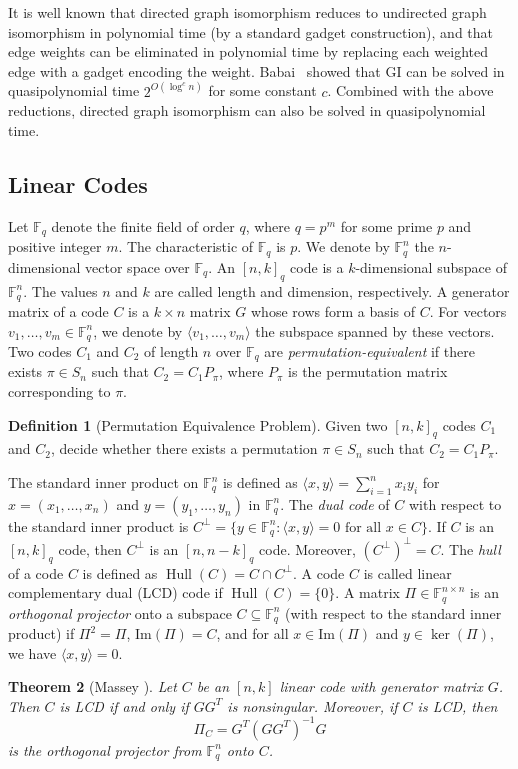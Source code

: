\documentclass[11pt]{article}
\newcommand{\FF}{\mathbb{F}}
\newcommand{\0}{\mathbf{0}}
\newcommand{\1}{\mathbf{1}}
\DeclareMathOperator{\Hull}{Hull}
\theoremstyle{plain}
\newtheorem{theorem}{Theorem}[section]
\theoremstyle{definition}
\newtheorem{definition}[theorem]{Definition}
\theoremstyle{remark}
\begin{document}
It is well known that directed graph isomorphism reduces to undirected graph isomorphism in polynomial time (by a standard gadget construction), and that edge weights can be eliminated in polynomial time by replacing each weighted edge with a gadget encoding the weight. Babai~\cite{babai2016} showed that GI can be solved in quasipolynomial time $2^{O(\log^c n)}$ for some constant $c$. Combined with the above reductions, directed graph isomorphism can also be solved in quasipolynomial time.

\subsection{Linear Codes}
Let $\FF_q$ denote the finite field of order $q$, where $q = p^m$ for some prime $p$ and positive integer $m$. The characteristic of $\FF_q$ is $p$. We denote by $\FF_q^n$ the $n$-dimensional vector space over $\FF_q$.
An $[n,k]_q$ code is a $k$-dimensional subspace of $\FF_q^n$.
The values $n$ and $k$ are called length and dimension, respectively.
A generator matrix of a code $C$ is a $k \times n$ matrix $G$ whose rows form a basis of $C$.
For vectors $v_1, \ldots, v_m \in \FF_q^n$, we denote by $\langle v_1, \ldots, v_m \rangle$ the subspace spanned by these vectors.
Two codes $C_1$ and $C_2$ of length $n$ over $\FF_q$ are \emph{permutation-equivalent} if there exists $\pi \in S_n$ such that $C_2 = C_1 P_\pi$, where $P_\pi$ is the permutation matrix corresponding to $\pi$.

\begin{definition}[Permutation Equivalence Problem]
Given two $[n,k]_q$ codes $C_1$ and $C_2$, decide whether there exists a permutation $\pi \in S_n$ such that $C_2 = C_1 P_\pi$.
\end{definition}

The standard inner product on $\FF_q^n$ is defined as $\langle x, y \rangle = \sum_{i=1}^n x_i y_i$ for $x = (x_1, \ldots, x_n)$ and $y = (y_1, \ldots, y_n)$ in $\FF_q^n$.
The \emph{dual code} of $C$ with respect to the standard inner product is $C^\perp = \{y \in \FF_q^n : \langle x, y \rangle = 0 \text{ for all } x \in C\}$.
If $C$ is an $[n,k]_q$ code, then $C^\perp$ is an $[n,n-k]_q$ code. Moreover, $(C^\perp)^\perp = C$.
The \emph{hull} of a code $C$ is defined as $\Hull(C) = C \cap C^\perp$.
A code $C$ is called linear complementary dual (LCD) code if $\Hull(C) = \{0\}$.
A matrix $\Pi \in \FF_q^{n \times n}$ is an \emph{orthogonal projector} onto a subspace $C \subseteq \FF_q^n$ (with respect to the standard inner product) if $\Pi^2 = \Pi$, $\text{Im}(\Pi) = C$, and for all $x \in \text{Im}(\Pi)$ and $y \in \ker(\Pi)$, we have $\langle x, y \rangle = 0$.
\begin{theorem}[Massey \cite{massey1992linear}]
\label{thm:massey}
Let $C$ be an $[n,k]$ linear code with generator matrix $G$. Then $C$ is LCD if and only if $GG^T$ is nonsingular. Moreover, if $C$ is LCD, then
$$\Pi_C = G^T(GG^T)^{-1}G$$
is the orthogonal projector from $\FF_q^n$ onto $C$.
\end{theorem}
\end{document}
